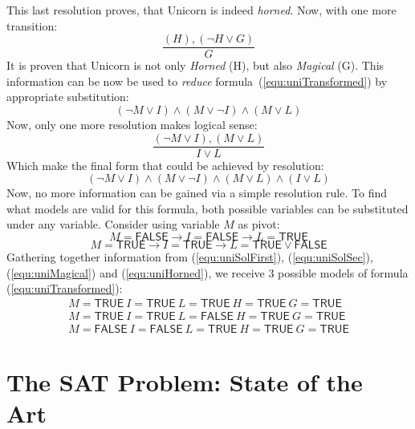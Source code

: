 \documentclass[12pt,english,pdflatex]{aghdpl}
\begin{document}
This last resolution proves, that Unicorn is indeed \textit{horned}.
Now, with one more transition:
\begin{equation}
\label{equ:uniMagical}
\frac{(H), (\neg H \vee G)}{G}
\end{equation}
It is proven that Unicorn is not only \textit{Horned} (H), but also \textit{Magical} (G). This information can be now be used to \textit{reduce} formula~(\ref{equ:uniTransformed}) by appropriate substitution:
\begin{equation}
\label{equ:uniReduced}
(\neg M \vee I) \wedge (M \vee \neg I) \wedge (M \vee L)
\end{equation}
Now, only one more resolution makes logical sense:
\begin{equation}
\frac{(\neg M \vee I), (M \vee L)}{I \vee L}
\end{equation}
Which make the final form that could be achieved by resolution:
\begin{equation}
\label{equ:uniFinal}
(\neg M \vee I) \wedge (M \vee \neg I) \wedge (M \vee L) \wedge (I \vee L)
\end{equation}
Now, no more information can be gained via a simple resolution rule. To find what models are valid for this formula, both possible variables can be substituted under any variable. Consider using variable $M$ as pivot:
\begin{equation}
\label{equ:uniSolFirst}
M = \mathsf{FALSE} \rightarrow I = \mathsf{FALSE} \rightarrow L = \mathsf{TRUE}
\end{equation}
\begin{equation}
\label{equ:uniSolSec}
M = \mathsf{TRUE} \rightarrow I = \mathsf{TRUE} \rightarrow L = \mathsf{TRUE} \vee \mathsf{FALSE}
\end{equation}
Gathering together information from (\ref{equ:uniSolFirst}), (\ref{equ:uniSolSec}), (\ref{equ:uniMagical}) and (\ref{equ:uniHorned}), we receive 3 possible models of formula (\ref{equ:uniTransformed}):
\begin{gather}
M = \mathsf{TRUE}\ I = \mathsf{TRUE}\ L = \mathsf{TRUE}\ H = \mathsf{TRUE}\ G = \mathsf{TRUE} \\
M = \mathsf{TRUE}\ I = \mathsf{TRUE}\ L = \mathsf{FALSE}\ H = \mathsf{TRUE}\ G = \mathsf{TRUE} \\
M = \mathsf{FALSE}\ I = \mathsf{FALSE}\ L = \mathsf{TRUE}\ H = \mathsf{TRUE}\ G = \mathsf{TRUE}
\end{gather}

\chapter{The SAT Problem: State of the Art}
\label{chap:SoA-2}
\end{document}
